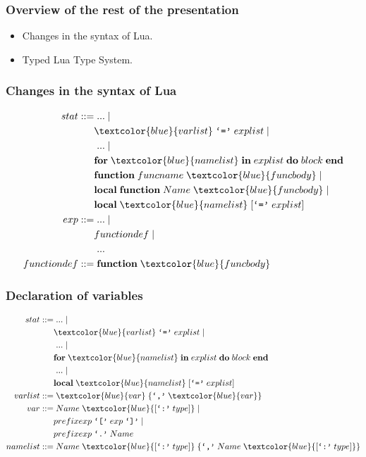 \documentclass{beamer}
\begin{document}
\begin{frame}
\frametitle{Overview of the rest of the presentation}
\begin{itemize}
\item Changes in the syntax of Lua.
\item Typed Lua Type System.
\end{itemize}
\end{frame}

\begin{frame}
\frametitle{Changes in the syntax of Lua}
\begin{align*}
stat ::= & \; ... \; |\\
& \textcolor{blue}{varlist} \; \texttt{`='} \; explist \; |\\
& \; ... \; |\\
& \textbf{for} \; \textcolor{blue}{namelist} \; \textbf{in} \;
explist \; \textbf{do} \; block \; \textbf{end}\\
& \textbf{function} \; funcname \; \textcolor{blue}{funcbody} \; |\\
& \textbf{local} \; \textbf{function} \; Name \; \textcolor{blue}{funcbody} \; |\\
& \textbf{local} \; \textcolor{blue}{namelist} \; [\texttt{`='} \; explist]\\
exp ::= & \; ... \; |\\
& functiondef \; |\\
& \; ...\\
functiondef ::= & \; \textbf{function} \; \textcolor{blue}{funcbody}
\end{align*}
\end{frame}

\begin{frame}
\frametitle{Declaration of variables}
\begin{align*}
stat ::= & \; ... \; |\\
& \textcolor{blue}{varlist} \; \texttt{`='} \; explist \; |\\
& \; ... \; |\\
& \textbf{for} \; \textcolor{blue}{namelist} \; \textbf{in} \;
explist \; \textbf{do} \; block \; \textbf{end}\\
& \; ... \; |\\
& \textbf{local} \; \textcolor{blue}{namelist} \; [\texttt{`='} \; explist]\\
varlist ::= & \; \textcolor{blue}{var} \; \{\texttt{`,'} \; \textcolor{blue}{var}\}\\
var ::= & \; Name \; \textcolor{blue}{[\texttt{`:'} \; type]} \; |\\
& prefixexp \; \texttt{`['} \; exp \; \texttt{`]'} \; |\\
& prefixexp \; \texttt{`.'} \; Name\\
namelist ::= & \; Name \; \textcolor{blue}{[\texttt{`:'} \; type]} \;
\{\texttt{`,'} \; Name \; \textcolor{blue}{[\texttt{`:'} \; type]}\}
\end{align*}
\end{frame}
\end{document}
